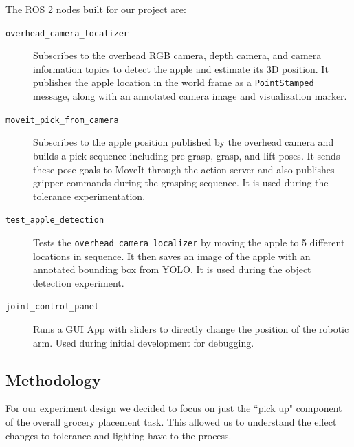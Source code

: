 \documentclass{article}
\begin{document}
The ROS 2 nodes built for our project are:
\begin{description}
    \item[\texttt{overhead\_camera\_localizer}] Subscribes to the overhead RGB camera, depth camera, and camera information topics to detect the apple and estimate its 3D position. It publishes the apple location in the world frame as a \texttt{PointStamped} message, along with an annotated camera image and visualization marker.
    
    \item[\texttt{moveit\_pick\_from\_camera}] Subscribes to the apple position published by the overhead camera and builds a pick sequence including pre-grasp, grasp, and lift poses. It sends these pose goals to MoveIt through the action server and also publishes gripper commands during the grasping sequence. It is used during the tolerance experimentation.
    
    \item[\texttt{test\_apple\_detection}] Tests the \texttt{overhead\_camera\_localizer} by moving the apple to 5 different locations in sequence. It then saves an image of the apple with an annotated bounding box from YOLO. It is used during the object detection experiment.

    \item[\texttt{joint\_control\_panel}] Runs a GUI App with sliders to directly change the position of the robotic arm. Used during initial development for debugging.

\end{description}

\subsection{Methodology}

For our experiment design we decided to focus on just the ``pick up" component of the overall grocery placement task. This allowed us to understand the effect changes to tolerance and lighting have to the process. 
\end{document}
